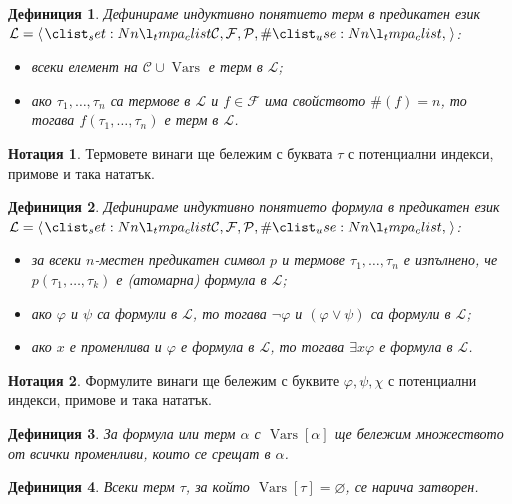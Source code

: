 \documentclass[12pt]{article}
\newcommand{\vars}{\operatorname{Vars}}
\newcommand{\calL}{\mathcal{L}}
\newcommand{\calF}{\mathcal{F}}
\newcommand{\calP}{\mathcal{P}}
\newcommand{\calC}{\mathcal{C}}
\newtheorem*{definition}{Дефиниция}
\theoremstyle{definition}
\newtheorem*{notation}{Нотация}
\begin{document}
\begin{definition}
    Дефинираме индуктивно понятието терм в предикатен език $\calL = \opair{\calC, \calF, \calP, \#}$:
    \begin{itemize}
        \item всеки елемент на $\calC \cup \vars$ е терм в $\calL$;
        \item ако $\tau_1, \dots, \tau_n$ са термове в $\calL$ и $f \in \calF$ има свойството $\#(f) = n$, то тогава $f(\tau_1, \dots, \tau_n)$ е терм в $\calL$.
    \end{itemize}
\end{definition}

\begin{notation}
    Термовете винаги ще бележим с буквата $\tau$ с потенциални индекси, примове и така нататък.
\end{notation}

\begin{definition}
    Дефинираме индуктивно понятието формула в предикатен език $\calL = \opair{\calC, \calF, \calP, \#}$:
    \begin{itemize}
        \item за всеки $n$-местен предикатен символ $p$ и термове $\tau_1, \dots, \tau_n$ е изпълнено, че $p(\tau_1, \dots, \tau_k)$ е (атомарна) формула в $\calL$;
        \item ако $\varphi$ и $\psi$ са формули в $\calL$, то тогава $\neg \varphi$ и $(\varphi \lor \psi)$ са формули в $\calL$;
        \item ако $x$ е променлива и $\varphi$ е формула в $\calL$, то тогава $\exists x \varphi$ е формула в $\calL$.
    \end{itemize}
\end{definition}

\begin{notation}
    Формулите винаги ще бележим с буквите $\varphi, \psi, \chi$ с потенциални индекси, примове и така нататък.
\end{notation}

\begin{definition}
    За формула или терм $\alpha$ с $\vars[\alpha]$ ще бележим множеството от всички променливи, които се срещат в $\alpha$.
\end{definition}

\begin{definition}
    Всеки терм $\tau$, за който $\vars[\tau] = \varnothing$, се нарича затворен.
\end{definition}
\end{document}

